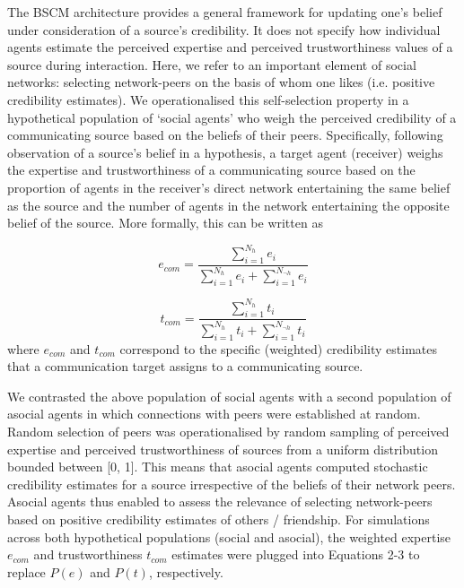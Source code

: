 \documentclass[fleqn,10pt]{wlscirep}
\begin{document}
The BSCM architecture provides a general framework for updating one's belief under consideration of a source's credibility. It does not specify how individual agents estimate the perceived expertise and perceived trustworthiness values of a source during interaction. Here, we refer to an important element of social networks: selecting network-peers on the basis of whom one likes (i.e. positive credibility estimates). We operationalised this self-selection property in a hypothetical population of `social agents' who weigh the perceived credibility of a communicating source based on the beliefs of their peers. Specifically, following observation of a source's belief in a hypothesis, a target agent (receiver) weighs the expertise and trustworthiness of a communicating source based on the proportion of agents in the receiver's direct network entertaining the same belief as the source and the number of agents in the network entertaining the opposite belief of the source. More formally, this can be written as  

\begin{equation}
    e_{com} = \frac{\sum_{i=1}^{N_h}e_i}{\sum_{i=1}^{N_h}e_i + \sum_{i=1}^{N_{\neg h}}e_i}          
\end{equation}

\begin{equation}
    t_{com} = \frac{\sum_{i=1}^{N_h}t_i}{\sum_{i=1}^{N_h}t_i + \sum_{i=1}^{N_{\neg h}}t_i}
\end{equation}
where \(e_{com}\) and \(t_{com}\) correspond to the specific (weighted) credibility estimates that a communication target assigns to a communicating source.


We contrasted the above population of social agents with a second population of asocial agents in which connections with peers were established at random. Random selection of peers was operationalised by random sampling of perceived expertise and perceived trustworthiness of sources from a uniform distribution bounded between [0, 1]. This means that asocial agents computed stochastic credibility estimates for a source irrespective of the beliefs of their network peers. Asocial agents thus enabled to assess the relevance of selecting network-peers based on positive credibility estimates of others / friendship. For simulations across both hypothetical populations (social and asocial), the weighted expertise \(e_{com}\) and trustworthiness \(t_{com}\) estimates were plugged into Equations 2-3 to replace \(P(e)\) and \(P(t)\), respectively. 
\end{document}
